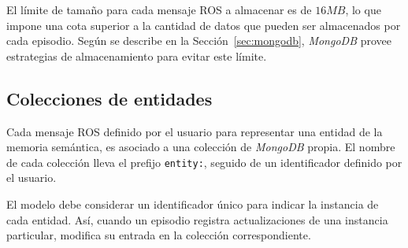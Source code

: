 El límite de tamaño para cada mensaje ROS a almacenar es de $16 MB$, lo que impone una cota superior a la cantidad de datos que pueden ser almacenados por cada episodio. Según se describe en la Sección~\ref{sec:mongodb}, \textit{MongoDB} provee estrategias de almacenamiento para evitar este límite.



\subsection{Colecciones de entidades}

Cada mensaje ROS definido por el usuario para representar una entidad de la memoria semántica, es asociado a una colección de \textit{MongoDB} propia. El nombre de cada colección lleva el prefijo \texttt{entity:}, seguido de un identificador definido por el usuario. 

El modelo debe considerar un identificador único para indicar la instancia de cada entidad. Así, cuando un episodio registra actualizaciones de una instancia particular, modifica su entrada en la colección correspondiente.

